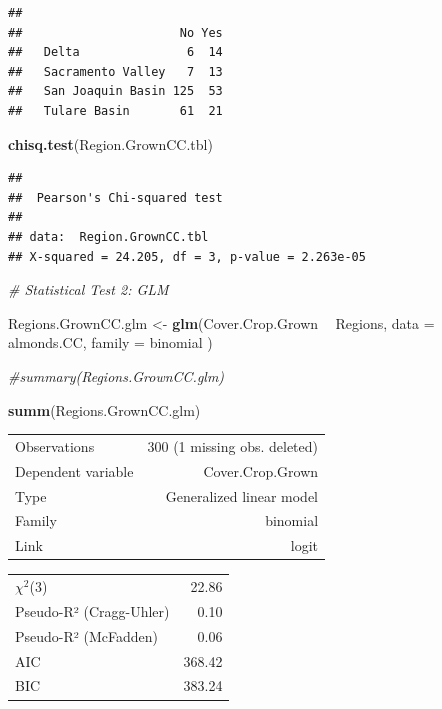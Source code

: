 \documentclass[12pt,]{article}
\newenvironment{Shaded}{\begin{snugshade}}{\end{snugshade}}
\newcommand{\KeywordTok}[1]{\textcolor[rgb]{0.13,0.29,0.53}{\textbf{#1}}}
\newcommand{\DataTypeTok}[1]{\textcolor[rgb]{0.13,0.29,0.53}{#1}}
\newcommand{\StringTok}[1]{\textcolor[rgb]{0.31,0.60,0.02}{#1}}
\newcommand{\CommentTok}[1]{\textcolor[rgb]{0.56,0.35,0.01}{\textit{#1}}}
\newcommand{\OperatorTok}[1]{\textcolor[rgb]{0.81,0.36,0.00}{\textbf{#1}}}
\newcommand{\NormalTok}[1]{#1}
\begin{document}
\begin{verbatim}
##                    
##                      No Yes
##   Delta               6  14
##   Sacramento Valley   7  13
##   San Joaquin Basin 125  53
##   Tulare Basin       61  21
\end{verbatim}

\begin{Shaded}
\begin{Highlighting}[]
\KeywordTok{chisq.test}\NormalTok{(Region.GrownCC.tbl)}
\end{Highlighting}
\end{Shaded}

\begin{verbatim}
## 
##  Pearson's Chi-squared test
## 
## data:  Region.GrownCC.tbl
## X-squared = 24.205, df = 3, p-value = 2.263e-05
\end{verbatim}

\begin{Shaded}
\begin{Highlighting}[]
\CommentTok{# Statistical Test 2: GLM}

\NormalTok{Regions.GrownCC.glm <-}\StringTok{ }\KeywordTok{glm}\NormalTok{(Cover.Crop.Grown }\OperatorTok{~}\StringTok{  }\NormalTok{Regions, }
                             \DataTypeTok{data =}\NormalTok{ almonds.CC, }\DataTypeTok{family =}\NormalTok{ binomial )}

\CommentTok{#summary(Regions.GrownCC.glm)}

\KeywordTok{summ}\NormalTok{(Regions.GrownCC.glm)}
\end{Highlighting}
\end{Shaded}

\begin{table}[!h]
\centering
\begin{tabular}{lr}
\toprule
\rowcolor{gray!6}  Observations & 300 (1 missing obs. deleted)\\
Dependent variable & Cover.Crop.Grown\\
\rowcolor{gray!6}  Type & Generalized linear model\\
Family & binomial\\
\rowcolor{gray!6}  Link & logit\\
\bottomrule
\end{tabular}
\end{table}

\begin{table}[!h]
\centering
\begin{tabular}{lr}
\toprule
\rowcolor{gray!6}  $\chi^2$(3) & 22.86\\
Pseudo-R² (Cragg-Uhler) & 0.10\\
\rowcolor{gray!6}  Pseudo-R² (McFadden) & 0.06\\
AIC & 368.42\\
\rowcolor{gray!6}  BIC & 383.24\\
\bottomrule
\end{tabular}
\end{table}
\end{document}
